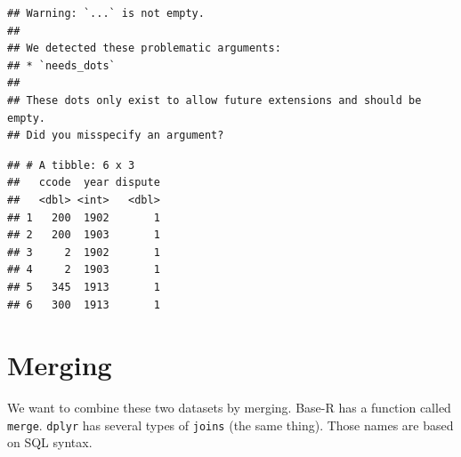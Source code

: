 \documentclass[
]{book}
\newenvironment{Shaded}{\begin{snugshade}}{\end{snugshade}}
\newcommand{\CommentTok}[1]{\textcolor[rgb]{0.56,0.35,0.01}{\textit{#1}}}
\newcommand{\ControlFlowTok}[1]{\textcolor[rgb]{0.13,0.29,0.53}{\textbf{#1}}}
\newcommand{\DataTypeTok}[1]{\textcolor[rgb]{0.13,0.29,0.53}{#1}}
\newcommand{\DecValTok}[1]{\textcolor[rgb]{0.00,0.00,0.81}{#1}}
\newcommand{\KeywordTok}[1]{\textcolor[rgb]{0.13,0.29,0.53}{\textbf{#1}}}
\newcommand{\NormalTok}[1]{#1}
\newcommand{\OperatorTok}[1]{\textcolor[rgb]{0.81,0.36,0.00}{\textbf{#1}}}
\newcommand{\StringTok}[1]{\textcolor[rgb]{0.31,0.60,0.02}{#1}}
\theoremstyle{definition}
\theoremstyle{definition}
\theoremstyle{definition}
\theoremstyle{definition}
\theoremstyle{remark}
\begin{document}
\begin{Shaded}
\end{Shaded}

\begin{verbatim}
## Warning: `...` is not empty.
## 
## We detected these problematic arguments:
## * `needs_dots`
## 
## These dots only exist to allow future extensions and should be empty.
## Did you misspecify an argument?
\end{verbatim}

\begin{verbatim}
## # A tibble: 6 x 3
##   ccode  year dispute
##   <dbl> <int>   <dbl>
## 1   200  1902       1
## 2   200  1903       1
## 3     2  1902       1
## 4     2  1903       1
## 5   345  1913       1
## 6   300  1913       1
\end{verbatim}

\hypertarget{merging}{%
\section{Merging}\label{merging}}

We want to combine these two datasets by merging. Base-R has a function called \texttt{merge}. \texttt{dplyr} has several types of \texttt{joins} (the same thing). Those names are based on SQL syntax.
\end{document}

